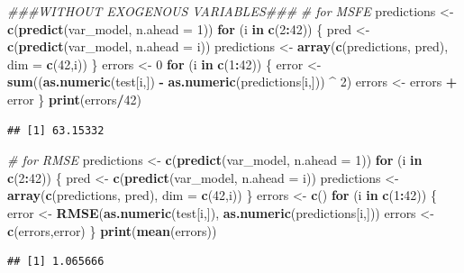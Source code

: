 \documentclass[]{article}
\newenvironment{Shaded}{\begin{snugshade}}{\end{snugshade}}
\newcommand{\CommentTok}[1]{\textcolor[rgb]{0.56,0.35,0.01}{\textit{#1}}}
\newcommand{\ControlFlowTok}[1]{\textcolor[rgb]{0.13,0.29,0.53}{\textbf{#1}}}
\newcommand{\DataTypeTok}[1]{\textcolor[rgb]{0.13,0.29,0.53}{#1}}
\newcommand{\DecValTok}[1]{\textcolor[rgb]{0.00,0.00,0.81}{#1}}
\newcommand{\KeywordTok}[1]{\textcolor[rgb]{0.13,0.29,0.53}{\textbf{#1}}}
\newcommand{\NormalTok}[1]{#1}
\newcommand{\OperatorTok}[1]{\textcolor[rgb]{0.81,0.36,0.00}{\textbf{#1}}}
\newcommand{\StringTok}[1]{\textcolor[rgb]{0.31,0.60,0.02}{#1}}
\begin{document}
\begin{Shaded}
\begin{Highlighting}[]
\CommentTok{###WITHOUT EXOGENOUS VARIABLES###}
\CommentTok{# for MSFE}
\NormalTok{predictions <-}\StringTok{ }\KeywordTok{c}\NormalTok{(}\KeywordTok{predict}\NormalTok{(var_model, }\DataTypeTok{n.ahead =} \DecValTok{1}\NormalTok{))}
\ControlFlowTok{for}\NormalTok{ (i }\ControlFlowTok{in} \KeywordTok{c}\NormalTok{(}\DecValTok{2}\OperatorTok{:}\DecValTok{42}\NormalTok{)) \{}
\NormalTok{  pred <-}\StringTok{ }\KeywordTok{c}\NormalTok{(}\KeywordTok{predict}\NormalTok{(var_model, }\DataTypeTok{n.ahead =}\NormalTok{ i))}
\NormalTok{  predictions <-}\StringTok{ }\KeywordTok{array}\NormalTok{(}\KeywordTok{c}\NormalTok{(predictions, pred), }\DataTypeTok{dim =} \KeywordTok{c}\NormalTok{(}\DecValTok{42}\NormalTok{,i))}
\NormalTok{\}}
\NormalTok{errors <-}\StringTok{ }\DecValTok{0}
\ControlFlowTok{for}\NormalTok{ (i }\ControlFlowTok{in} \KeywordTok{c}\NormalTok{(}\DecValTok{1}\OperatorTok{:}\DecValTok{42}\NormalTok{)) \{}
\NormalTok{  error <-}\StringTok{ }\KeywordTok{sum}\NormalTok{((}\KeywordTok{as.numeric}\NormalTok{(test[i,]) }\OperatorTok{-}\StringTok{ }\KeywordTok{as.numeric}\NormalTok{(predictions[i,])) }\OperatorTok{^}\StringTok{ }\DecValTok{2}\NormalTok{)}
\NormalTok{  errors <-}\StringTok{ }\NormalTok{errors }\OperatorTok{+}\StringTok{ }\NormalTok{error}
\NormalTok{\}}
\KeywordTok{print}\NormalTok{(errors}\OperatorTok{/}\DecValTok{42}\NormalTok{)}
\end{Highlighting}
\end{Shaded}

\begin{verbatim}
## [1] 63.15332
\end{verbatim}

\begin{Shaded}
\begin{Highlighting}[]
\CommentTok{# for RMSE}
\NormalTok{predictions <-}\StringTok{ }\KeywordTok{c}\NormalTok{(}\KeywordTok{predict}\NormalTok{(var_model, }\DataTypeTok{n.ahead =} \DecValTok{1}\NormalTok{))}
\ControlFlowTok{for}\NormalTok{ (i }\ControlFlowTok{in} \KeywordTok{c}\NormalTok{(}\DecValTok{2}\OperatorTok{:}\DecValTok{42}\NormalTok{)) \{}
\NormalTok{  pred <-}\StringTok{ }\KeywordTok{c}\NormalTok{(}\KeywordTok{predict}\NormalTok{(var_model, }\DataTypeTok{n.ahead =}\NormalTok{ i))}
\NormalTok{  predictions <-}\StringTok{ }\KeywordTok{array}\NormalTok{(}\KeywordTok{c}\NormalTok{(predictions, pred), }\DataTypeTok{dim =} \KeywordTok{c}\NormalTok{(}\DecValTok{42}\NormalTok{,i))}
\NormalTok{\}}
\NormalTok{errors <-}\StringTok{ }\KeywordTok{c}\NormalTok{()}
\ControlFlowTok{for}\NormalTok{ (i }\ControlFlowTok{in} \KeywordTok{c}\NormalTok{(}\DecValTok{1}\OperatorTok{:}\DecValTok{42}\NormalTok{)) \{}
\NormalTok{  error <-}\StringTok{ }\KeywordTok{RMSE}\NormalTok{(}\KeywordTok{as.numeric}\NormalTok{(test[i,]), }\KeywordTok{as.numeric}\NormalTok{(predictions[i,]))}
\NormalTok{  errors <-}\StringTok{ }\KeywordTok{c}\NormalTok{(errors,error)}
\NormalTok{\}}
\KeywordTok{print}\NormalTok{(}\KeywordTok{mean}\NormalTok{(errors))}
\end{Highlighting}
\end{Shaded}

\begin{verbatim}
## [1] 1.065666
\end{verbatim}
\end{document}
